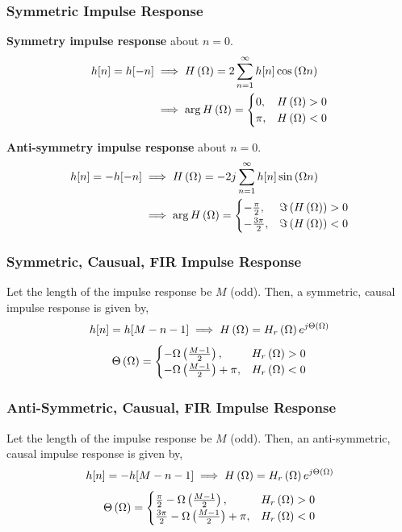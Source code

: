 \documentclass[aspectratio=169]{beamer}
\def\lp{\ensuremath\left(}
\def\rp{\ensuremath\right)}
\begin{document}
\begin{frame}[t]
  \frametitle{Symmetric Impulse Response}
  
  \textbf{Symmetry impulse response} about $n = 0$.
  \[ \begin{split} h[n] = h[-n] & \implies H\lp \Omega \rp = 2 \sum_{n=1}^{\infty} h[n] \cos \lp \Omega n\rp \\ 
      & \implies \arg H\lp \Omega \rp = \begin{cases} 0, & H\lp \Omega \rp > 0 \\ \pi, & H\lp \Omega \rp < 0 \end{cases}
     \end{split}
     \]
  
  \textbf{Anti-symmetry impulse response} about $n = 0$.
  \[ \begin{split} h[n] = -h[-n] & \implies H\lp \Omega \rp = -2j \sum_{n=1}^{\infty} h[n] \sin \lp \Omega n\rp \\ 
      & \implies \arg H\lp \Omega \rp = \begin{cases} -\frac{\pi}{2}, & \Im \lp H\lp \Omega \rp \rp > 0 \\ -\frac{3\pi}{2}, & \Im \lp H\lp \Omega \rp \rp < 0 \end{cases}
     \end{split}
     \]
\end{frame}


\begin{frame}[t]
  \frametitle{Symmetric, Causual, FIR Impulse Response}
  
  Let the length of the impulse response be $M$ (odd). Then, a symmetric, causal impulse response is given by,
  \[ h[n] = h[M - n -1] \implies H\lp \Omega \rp = H_r\lp \Omega \rp e^{j \Theta\lp \Omega \rp}\]
  \[ \Theta\lp \Omega \rp = \begin{cases} -\Omega \lp \frac{M-1}{2}\rp, & H_r\lp \Omega \rp > 0 \\ -\Omega \lp \frac{M-1}{2} \rp + \pi, & H_r\lp \Omega \rp < 0 \\ \end{cases} \]
\end{frame}


\begin{frame}[t]
  \frametitle{Anti-Symmetric, Causual, FIR Impulse Response}
  
  Let the length of the impulse response be $M$ (odd). Then, an anti-symmetric, causal impulse response is given by,
  \[ h[n] = -h[M - n -1] \implies H\lp \Omega \rp = H_r\lp \Omega \rp e^{j \Theta\lp \Omega \rp}\]
  \[ \Theta\lp \Omega \rp = \begin{cases} \frac{\pi}{2} - \Omega \lp \frac{M-1}{2}\rp, & H_r\lp \Omega \rp > 0 \\ \frac{3\pi}{2}  - \Omega \lp \frac{M-1}{2} \rp + \pi, & H_r\lp \Omega \rp < 0 \\ \end{cases} \]
\end{frame}
\end{document}

